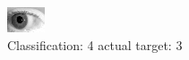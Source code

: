 \begin{figure}[h!]
\begin{center}
\includegraphics[width=0.60\columnwidth]{figures/ID326_class_4_target_3.png}
\end{center}
\caption{ Classification: 4 actual target: 3}
\label{fig:ID326_class_4_target_3}
\end{figure}

